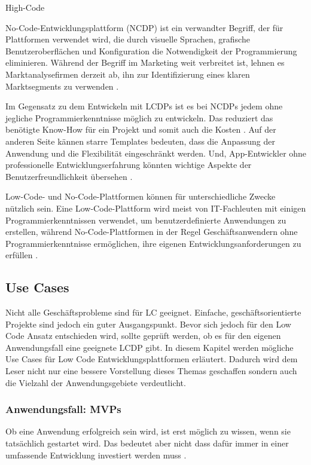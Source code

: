 \documentclass[12pt]{article} %
\begin{document}
	High-Code \cite{Alamin.2023}
	
	No-Code-Entwicklungsplattform (NCDP) ist ein verwandter Begriff, der für Plattformen verwendet wird, die durch visuelle Sprachen, grafische Benutzeroberflächen und Konfiguration die Notwendigkeit der Programmierung eliminieren. Während der Begriff im Marketing weit verbreitet ist, lehnen es Marktanalysefirmen derzeit ab, ihn zur Identifizierung eines klaren Marktsegments zu verwenden \cite{DiRuscio.2022}.
	
	Im Gegensatz zu dem Entwickeln mit LCDPs ist es bei NCDPs jedem ohne jegliche Programmierkenntnisse möglich zu entwickeln. Das reduziert das benötigte Know-How für ein Projekt und somit auch die Kosten \cite{Microsoft.2023}. \newline
	Auf der anderen Seite kännen starre Templates bedeuten, dass die Anpassung der Anwendung und die Flexibilität eingeschränkt werden.
	Und, App-Entwickler ohne professionelle Entwicklungserfahrung könnten wichtige Aspekte der Benutzerfreundlichkeit übersehen \cite{Microsoft.2023}.
	
	Low-Code- und No-Code-Plattformen können für unterschiedliche Zwecke nützlich sein. Eine Low-Code-Plattform wird meist von IT-Fachleuten mit einigen Programmierkenntnissen verwendet, um benutzerdefinierte Anwendungen zu erstellen, während No-Code-Plattformen in der Regel Geschäftsanwendern ohne Programmierkenntnisse ermöglichen, ihre eigenen Entwicklungsanforderungen zu erfüllen \cite{Microsoft.2023}. 

	
	
	\subsection{Use Cases}	
	Nicht alle Geschäftsprobleme sind für LC geeignet. Einfache, geschäftsorientierte Projekte sind jedoch ein guter Ausgangspunkt. 
	Bevor sich jedoch für den Low Code Ansatz entschieden wird, sollte geprüft werden, ob es für den eigenen Anwendungsfall eine geeignete LCDP gibt. %
	In diesem Kapitel werden mögliche Use Cases für Low Code Entwicklungsplattformen erläutert. Dadurch wird dem Leser nicht nur eine bessere Vorstellung dieses Themas geschaffen sondern auch die Vielzahl der Anwendungsgebiete verdeutlicht. 
	
	\subsubsection{Anwendungsfall: MVPs}
	Ob eine Anwendung erfolgreich sein wird, ist erst möglich zu wissen, wenn sie tatsächlich gestartet wird. Das bedeutet aber nicht dass dafür immer in einer umfassende Entwicklung investiert werden muss \cite{OleksiiGlib.2022}.
	
\end{document}
